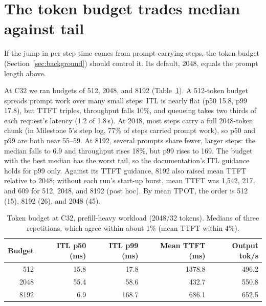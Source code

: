 \section{The token budget trades median against tail}
\label{sec:budget}

If the jump in per-step time comes from prompt-carrying steps, the token budget
(Section~\ref{sec:background}) should control it. Its default, 2048, equals the prompt
length above.

At C32 we ran budgets of 512, 2048, and 8192 (Table~\ref{tab:budget}). A 512-token
budget spreads prompt work over many small steps: ITL is nearly flat (p50 15.8\ms,
p99 17.8\ms), but TTFT triples, throughput falls 10\%, and queueing takes two thirds
of each request's latency (1.2 of 1.8\,s). At 2048, most steps carry a full 2048-token
chunk (in Milestone 5's step log, 77\% of steps carried prompt work), so p50 and p99
are both near 55--59\ms. At 8192, several prompts share fewer, larger steps: the
median falls to 6.9\ms{} and throughput rises 18\%, but p99 rises to 169\ms. The
budget with the best median has the worst tail, so the documentation's ITL guidance
holds for p99 only. Against its TTFT guidance, 8192 also raised mean TTFT relative to
2048; without each run's start-up burst, mean TTFT was 1{,}542, 217, and 609\ms{} for
512, 2048, and 8192 (post hoc). By mean TPOT, the order is 512 (15\ms), 8192
(26\ms), and 2048 (45\ms).

\begin{table}[t]
  \centering
  \caption{Token budget at C32, prefill-heavy workload (2048/32 tokens). Medians of
    three repetitions, which agree within about 1\% (mean TTFT within 4\%).}
  \label{tab:budget}
  \begin{tabular}{rrrrr}
    \toprule
    Budget & ITL p50 (ms) & ITL p99 (ms) & Mean TTFT (ms) & Output tok/s \\
    \midrule
    512  & 15.8 & 17.8  & 1378.8 & 496.2 \\
    2048 & 55.4 & 58.6  & 432.7  & 550.8 \\
    8192 & 6.9  & 168.7 & 686.1  & 652.5 \\
    \bottomrule
  \end{tabular}
\end{table}

